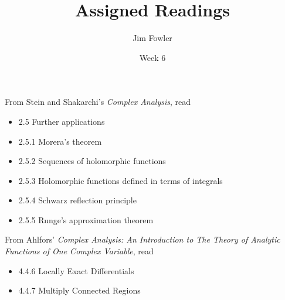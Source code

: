\documentclass{homework}
\author{Jim Fowler}
\title{Assigned Readings}
\date{Week 6}
\begin{document}
\maketitle


From Stein and Shakarchi's \textit{Complex Analysis}, read
\begin{itemize}
\item 2.5 Further applications
\item 2.5.1 Morera's theorem
\item 2.5.2 Sequences of holomorphic functions
\item 2.5.3 Holomorphic functions defined in terms of integrals
\item 2.5.4 Schwarz reflection principle
\item 2.5.5 Runge's approximation theorem
\end{itemize}

From Ahlfors' \textit{Complex Analysis: An Introduction to The Theory of Analytic Functions of One Complex Variable}, read
\begin{itemize}
\item 4.4.6 Locally Exact Differentials
\item 4.4.7 Multiply Connected Regions
\end{itemize}
\end{document}

